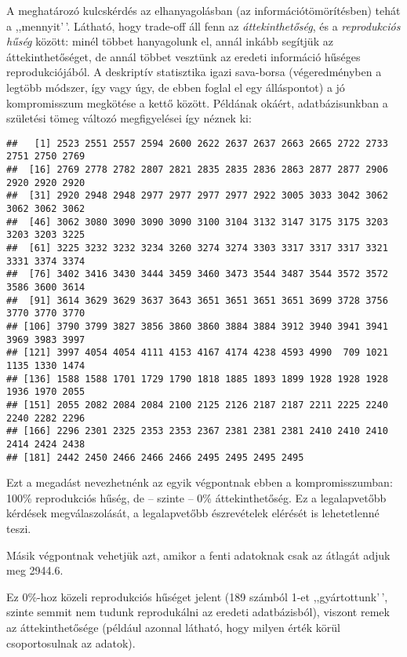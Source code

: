 \documentclass[
]{book}
\newenvironment{Shaded}{\begin{snugshade}}{\end{snugshade}}
\newcommand{\NormalTok}[1]{#1}
\newcommand{\SpecialCharTok}[1]{\textcolor[rgb]{0.00,0.00,0.00}{#1}}
\begin{document}
A meghatározó kulcskérdés az elhanyagolásban (az információtömörítésben) tehát a ,,mennyit'\,'. Látható, hogy trade-off áll fenn az \emph{áttekinthetőség}, és a \emph{reprodukciós hűség} között: minél többet hanyagolunk el, annál inkább segítjük az áttekinthetőséget, de annál többet vesztünk az eredeti információ hűséges reprodukciójából. A deskriptív statisztika igazi sava-borsa (végeredményben a legtöbb módszer, így vagy úgy, de ebben foglal el egy álláspontot) a jó kompromisszum megkötése a kettő között. Példának okáért, adatbázisunkban a születési tömeg változó megfigyelései így néznek ki:

\begin{Shaded}
\end{Shaded}

\begin{verbatim}
##   [1] 2523 2551 2557 2594 2600 2622 2637 2637 2663 2665 2722 2733 2751 2750 2769
##  [16] 2769 2778 2782 2807 2821 2835 2835 2836 2863 2877 2877 2906 2920 2920 2920
##  [31] 2920 2948 2948 2977 2977 2977 2977 2922 3005 3033 3042 3062 3062 3062 3062
##  [46] 3062 3080 3090 3090 3090 3100 3104 3132 3147 3175 3175 3203 3203 3203 3225
##  [61] 3225 3232 3232 3234 3260 3274 3274 3303 3317 3317 3317 3321 3331 3374 3374
##  [76] 3402 3416 3430 3444 3459 3460 3473 3544 3487 3544 3572 3572 3586 3600 3614
##  [91] 3614 3629 3629 3637 3643 3651 3651 3651 3651 3699 3728 3756 3770 3770 3770
## [106] 3790 3799 3827 3856 3860 3860 3884 3884 3912 3940 3941 3941 3969 3983 3997
## [121] 3997 4054 4054 4111 4153 4167 4174 4238 4593 4990  709 1021 1135 1330 1474
## [136] 1588 1588 1701 1729 1790 1818 1885 1893 1899 1928 1928 1928 1936 1970 2055
## [151] 2055 2082 2084 2084 2100 2125 2126 2187 2187 2211 2225 2240 2240 2282 2296
## [166] 2296 2301 2325 2353 2353 2367 2381 2381 2381 2410 2410 2410 2414 2424 2438
## [181] 2442 2450 2466 2466 2466 2495 2495 2495 2495
\end{verbatim}

Ezt a megadást nevezhetnénk az egyik végpontnak ebben a kompromisszumban: 100\% reprodukciós hűség, de -- szinte -- 0\% áttekinthetőség. Ez a legalapvetőbb kérdések megválaszolását, a legalapvetőbb észrevételek elérését is lehetetlenné teszi.

Másik végpontnak vehetjük azt, amikor a fenti adatoknak csak az átlagát adjuk meg 2944.6.

Ez 0\%-hoz közeli reprodukciós hűséget jelent (189 számból 1-et ,,gyártottunk'\,', szinte semmit nem tudunk reprodukálni az eredeti adatbázisból), viszont remek az áttekinthetősége (például azonnal látható, hogy milyen érték körül csoportosulnak az adatok).
\end{document}
